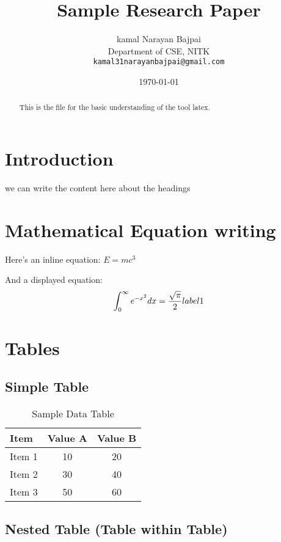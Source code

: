 \documentclass[12pt]{article}
\title{Sample Research Paper}
\author{kamal Narayan Bajpai\\
	\small Department of CSE, NITK \\
	\small \texttt{kamal31narayanbajpai@gmail.com}
}
\date{\today}
\begin{document}
	\maketitle
	\begin{abstract}
		This is the file for the basic understanding of the tool latex.
	\end{abstract}
	
	\section{Introduction}
	
	we can write the content here about the headings 
	
	
	\section{Mathematical Equation writing }
	Here’s an inline equation: \( E = mc^3 \)
	
	And a displayed equation:
	\begin{equation}
		\int_0^\infty e^{-x^2} dx = \frac{\sqrt{\pi}}{2}
		\\label{1}
	\end{equation}
	
	\section{Tables}
	
	\subsection{Simple Table}
	
	\begin{table}[H]
		\centering
		\caption{Sample Data Table}
		\begin{tabular}{lcc}
			\toprule
			Item & Value A & Value B \\
			\midrule
			Item 1 & 10 & 20 \\
			Item 2 & 30 & 40 \\
			Item 3 & 50 & 60 \\
			\bottomrule
		\end{tabular}
	\end{table}
	
	\subsection{Nested Table (Table within Table)}
	
\end{document}
